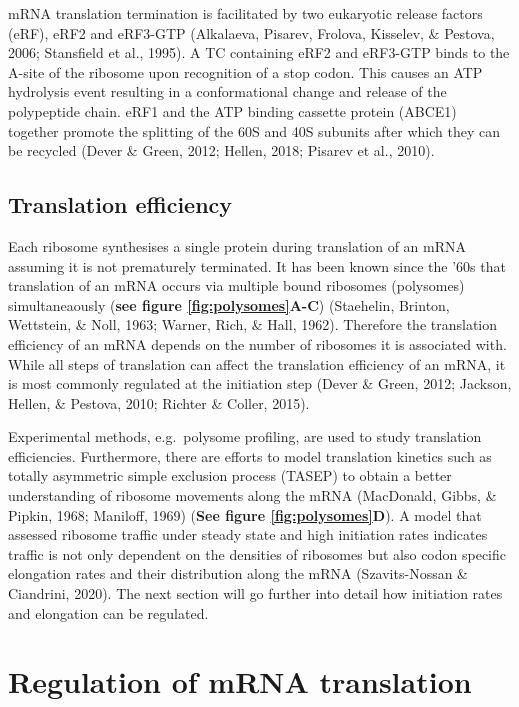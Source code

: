 \documentclass[
  12pt,
  openany]{book}
\begin{document}
mRNA translation termination is facilitated by two eukaryotic release factors (eRF), eRF2 and eRF3-GTP (Alkalaeva, Pisarev, Frolova, Kisselev, \& Pestova, 2006; Stansfield et al., 1995). A TC containing eRF2 and eRF3-GTP binds to the A-site of the ribosome upon recognition of a stop codon. This causes an ATP hydrolysis event resulting in a conformational change and release of the polypeptide chain. eRF1 and the ATP binding cassette protein (ABCE1) together promote the splitting of the 60S and 40S subunits after which they can be recycled (Dever \& Green, 2012; Hellen, 2018; Pisarev et al., 2010).

\subsection{Translation efficiency}

Each ribosome synthesises a single protein during translation of an mRNA assuming it is not prematurely terminated. It has been known since the '60s that translation of an mRNA occurs via multiple bound ribosomes (polysomes) simultaneaously (\textbf{see figure \ref{fig:polysomes}A-C}) (Staehelin, Brinton, Wettstein, \& Noll, 1963; Warner, Rich, \& Hall, 1962). Therefore the translation efficiency of an mRNA depends on the number of ribosomes it is associated with. While all steps of translation can affect the translation efficiency of an mRNA, it is most commonly regulated at the initiation step (Dever \& Green, 2012; Jackson, Hellen, \& Pestova, 2010; Richter \& Coller, 2015).

Experimental methods, e.g.~polysome profiling, are used to study translation efficiencies. Furthermore, there are efforts to model translation kinetics such as totally asymmetric simple exclusion process (TASEP) to obtain a better understanding of ribosome movements along the mRNA (MacDonald, Gibbs, \& Pipkin, 1968; Maniloff, 1969) (\textbf{See figure \ref{fig:polysomes}D}). A model that assessed ribosome traffic under steady state and high initiation rates indicates traffic is not only dependent on the densities of ribosomes but also codon specific elongation rates and their distribution along the mRNA (Szavits-Nossan \& Ciandrini, 2020). The next section will go further into detail how initiation rates and elongation can be regulated.
\newline

\section{Regulation of mRNA translation} \label{regmRNA}
\end{document}
